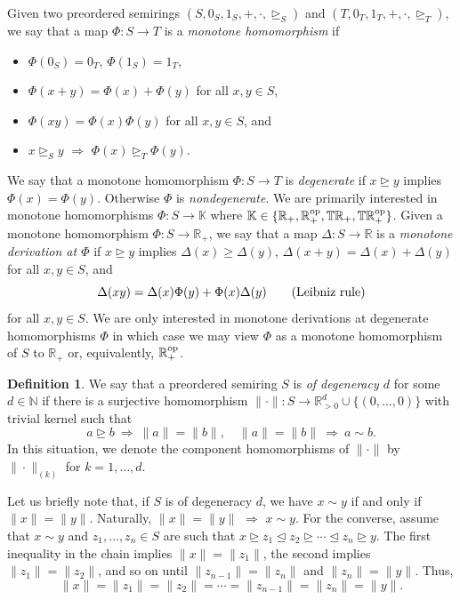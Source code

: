 \documentclass[12pt,a4paper,reqno]{amsart}
\newcommand{\rleq}{\trianglelefteq}
\newcommand{\rgeq}{\trianglerighteq}
\theoremstyle{definition}
\newtheorem{definition}[proposition]{Definition}
\newcommand{\mb}[1]{\mathbb{#1}}
\newcommand{\N}{\mathbb N}
\newcommand{\R}{\mathbb R}
\newcommand{\T}{\mathbb T}
\begin{document}
Given two preordered semirings $(S,0_S,1_S,+,\cdot,\rgeq_S)$ and $(T,0_T,1_T,+,\cdot,\rgeq_T)$, we say that a map $\Phi:S\to T$ is a {\it monotone homomorphism} if
\begin{itemize}
\item $\Phi(0_S)=0_T$, $\Phi(1_S)=1_T$,
\item $\Phi(x+y)=\Phi(x)+\Phi(y)$ for all $x,y\in S$,
\item $\Phi(xy)=\Phi(x)\Phi(y)$ for all $x,y\in S$, and
\item $x\rgeq_S y$ $\Rightarrow$ $\Phi(x)\rgeq_T\Phi(y)$.
\end{itemize}
We say that a monotone homomorphism $\Phi:S\to T$ is {\it degenerate} if $x\rgeq y$ implies $\Phi(x)=\Phi(y)$. Otherwise $\Phi$ is {\it nondegenerate}. We are primarily interested in monotone homomorphisms $\Phi:S\to\mb K$ where $\mb K\in\{\R_+,\R_+^{\rm op},\T\R_+,\T\R_+^{\rm op}\}$. Given a monotone homomorphism $\Phi:S\to\R_+$, we say that a map $\Delta:S\to\R$ is a {\it monotone derivation at $\Phi$} if $x\rgeq y$ implies $\Delta(x)\geq\Delta(y)$, $\Delta(x+y)=\Delta(x)+\Delta(y)$ for all $x,y\in S$, and
$$
\Delta(xy)=\Delta(x)\Phi(y)+\Phi(x)\Delta(y)\qquad{\rm (Leibniz\ rule)}
$$
for all $x,y\in S$. We are only interested in monotone derivations at degenerate homomorphisms $\Phi$ in which case we may view $\Phi$ as a monotone homomorphism of $S$ to $\R_+$ or, equivalently, $\R_+^{\rm op}$.

\begin{definition}\label{def:deg}
We say that a preordered semiring $S$ is {\it of degeneracy $d$} for some $d\in\N$ if there is a surjective homomorphism $\|\cdot\|:S\to\R_{>0}^d\cup\{(0,\ldots,0)\}$ with trivial kernel such that
$$
a\rgeq b\ \Rightarrow\ \|a\|=\|b\|,\quad \|a\|=\|b\|\ \Rightarrow\ a\sim b.
$$
In this situation, we denote the component homomorphisms of $\|\cdot\|$ by $\|\cdot\|_{(k)}$ for $k=1,\ldots,d$.
\end{definition}

Let us briefly note that, if $S$ is of degeneracy $d$, we have $x\sim y$ if and only if $\|x\|=\|y\|$. Naturally, $\|x\|=\|y\|$ $\Rightarrow$ $x\sim y$. For the converse, assume that $x\sim y$ and $z_1,\ldots,z_n\in S$ are such that $x\rgeq z_1\rleq z_2\rgeq\cdots\rleq z_n\rgeq y$. The first inequality in the chain implies $\|x\|=\|z_1\|$, the second implies $\|z_1\|=\|z_2\|$, and so on until $\|z_{n-1}\|=\|z_n\|$ and $\|z_n\|=\|y\|$. Thus,
$$
\|x\|=\|z_1\|=\|z_2\|=\cdots=\|z_{n-1}\|=\|z_n\|=\|y\|.
$$
\end{document}

